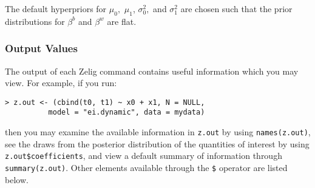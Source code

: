 \begin{itemize}
The default hyperpriors for $\mu_{0},$ $\mu_{1}$, $\sigma_{0}^{2},$
and $\sigma_{1}^{2}$ are chosen such that the prior distributions for
$\beta^b$ and $\beta^w$ are flat.

\end{itemize}

\subsubsection{Output Values}

The output of each Zelig command contains useful information which you may
view. For example, if you run:

\begin{verbatim}
> z.out <- (cbind(t0, t1) ~ x0 + x1, N = NULL, 
          model = "ei.dynamic", data = mydata)
\end{verbatim}
 
\noindent then you may examine the available information in 
\texttt{z.out} by using \texttt{names(z.out)}, see the draws from the
posterior distribution of the quantities of interest by using
\texttt{z.out\$coefficients}, and view a default summary of
information through \texttt{summary(z.out)}. Other elements available
through the \texttt{\$} operator are listed below.

